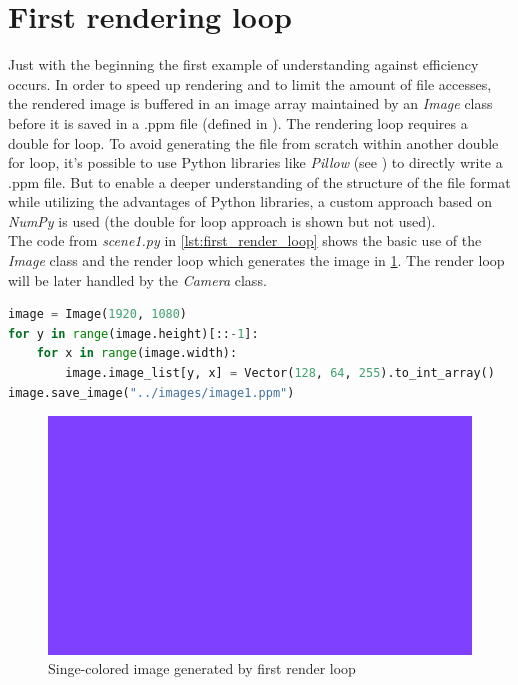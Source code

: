 \documentclass[]{article}
\begin{document}
	\section{First rendering loop}
	Just with the beginning the first example of understanding against efficiency occurs. In order to speed up rendering and to limit the amount of file accesses, the rendered image is buffered in an image array maintained by an \emph{Image} class before it is saved in a .ppm file (defined in \cite{PPM}). The rendering loop requires a double for loop. To avoid generating the file from scratch within another double for loop, it’s possible to use Python libraries like \emph{Pillow} (see \cite{PILLOW}) to directly write a .ppm file. But to enable a deeper understanding of the structure of the file format while utilizing the advantages of Python libraries, a custom approach based on \emph{NumPy} is used (the double for loop approach is shown but not used).
	\\
	The code from \emph{scene1.py} in \cref{lst:first_render_loop} shows the basic use of the \emph{Image} class and the render loop which generates the image in \cref{fig:image1}. The render loop will be later handled by the \emph{Camera} class.
	
	\begin{lstlisting}[caption={Example for a basic render loop}, language=Python, label=lst:first_render_loop]
image = Image(1920, 1080)
for y in range(image.height)[::-1]:
	for x in range(image.width):
		image.image_list[y, x] = Vector(128, 64, 255).to_int_array()
image.save_image("../images/image1.ppm")
	\end{lstlisting}

	\begin{figure}[h]
		\centering
		\includegraphics[width=0.9\linewidth]{image1}
		\caption{Singe-colored image generated by first render loop}
		\label{fig:image1}
	\end{figure}
\end{document}
